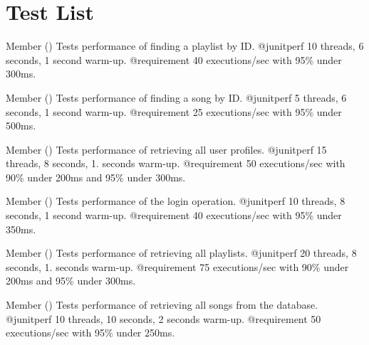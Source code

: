 \chapter{Test List}
\hypertarget{test}{}\label{test}

\begin{DoxyRefList}
\item[Member \doxylink{classcom_1_1deusto_1_1deuspotify_1_1_deuspotify_perf_i_t_aa1e705595754e5fb00b01137a4b72ba3}{com.deusto.deuspotify.Deuspotify\+Perf\+IT.test\+Find\+Playlist\+By\+Id\+Performance} ()]\label{test__test000053}%
%
Tests performance of finding a playlist by ID. @junitperf 10 threads, 6 seconds, 1 second warm-\/up. @requirement 40 executions/sec with 95\% under 300ms.  
\item[Member \doxylink{classcom_1_1deusto_1_1deuspotify_1_1_deuspotify_perf_i_t_a97a302051702747b2ef5c312692ae656}{com.deusto.deuspotify.Deuspotify\+Perf\+IT.test\+Find\+Song\+By\+Id\+Performance} ()]\label{test__test000052}%
%
Tests performance of finding a song by ID. @junitperf 5 threads, 6 seconds, 1 second warm-\/up. @requirement 25 executions/sec with 95\% under 500ms.  
\item[Member \doxylink{classcom_1_1deusto_1_1deuspotify_1_1_deuspotify_perf_i_t_a2650c6e6e1a4a9b8bc40f05d0bdbd189}{com.deusto.deuspotify.Deuspotify\+Perf\+IT.test\+Get\+All\+Profiles\+Performance} ()]\label{test__test000054}%
%
Tests performance of retrieving all user profiles. @junitperf 15 threads, 8 seconds, 1. seconds warm-\/up. @requirement 50 executions/sec with 90\% under 200ms and 95\% under 300ms.  
\item[Member \doxylink{classcom_1_1deusto_1_1deuspotify_1_1_deuspotify_perf_i_t_ae86d90ff0a2fc25d7c29e859200c4a66}{com.deusto.deuspotify.Deuspotify\+Perf\+IT.test\+Login\+Performance} ()]\label{test__test000055}%
%
Tests performance of the login operation. @junitperf 10 threads, 8 seconds, 1 second warm-\/up. @requirement 40 executions/sec with 95\% under 350ms.  
\item[Member \doxylink{classcom_1_1deusto_1_1deuspotify_1_1_deuspotify_perf_i_t_a1224ab3e104c5f88028530ac600fb920}{com.deusto.deuspotify.Deuspotify\+Perf\+IT.test\+Retrieve\+All\+Playlists\+Performance} ()]\label{test__test000051}%
%
Tests performance of retrieving all playlists. @junitperf 20 threads, 8 seconds, 1. seconds warm-\/up. @requirement 75 executions/sec with 90\% under 200ms and 95\% under 300ms.  
\item[Member \doxylink{classcom_1_1deusto_1_1deuspotify_1_1_deuspotify_perf_i_t_aeb6d9d92daf7457d86ee5d20a166aa72}{com.deusto.deuspotify.Deuspotify\+Perf\+IT.test\+Retrieve\+All\+Songs\+Performance} ()]\label{test__test000050}%
%
Tests performance of retrieving all songs from the database. @junitperf 10 threads, 10 seconds, 2 seconds warm-\/up. @requirement 50 executions/sec with 95\% under 250ms. 
\end{DoxyRefList}